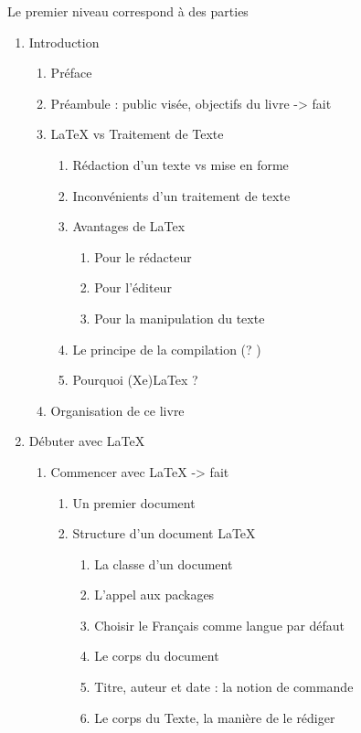 Le premier niveau correspond à des parties
\begin{enumerate}
\item Introduction
	
	\begin{enumerate}
	\item Préface
	\item Préambule : public visée, objectifs du livre			-> fait
	\item LaTeX vs Traitement de Texte
		\begin{enumerate}
		\item Rédaction d'un texte vs mise en forme
		\item Inconvénients d'un traitement de texte
		\item Avantages de LaTex
		\begin{enumerate}
			\item Pour le rédacteur
			\item Pour l'éditeur
			\item Pour la manipulation du texte
		\end{enumerate}
		\item Le principe de la compilation  (? )
		\item Pourquoi (Xe)LaTex ?
		\end{enumerate}
	\item Organisation de ce livre
	\end{enumerate}
\item Débuter avec LaTeX
\begin{enumerate}
	\item Commencer avec LaTeX						-> fait
	\begin{enumerate}
		\item Un premier document
		\item Structure d'un document LaTeX
		\begin{enumerate}
			\item La classe d'un document
			\item L'appel aux packages
			\item Choisir le Français comme langue par défaut
			\item Le corps du document
			\item Titre, auteur et date : la notion de commande
			\item Le corps du Texte, la manière de le rédiger

\end{enumerate}
\end{enumerate}
\end{enumerate}
\end{enumerate}
